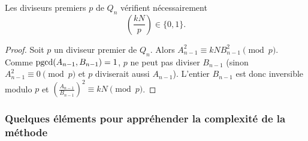 \begin{proposition}
	Les diviseurs premiers $p$ de $Q_n$ vérifient nécessairement
	\[\left(\frac{kN}{p} \right) \in \{0, 1\}.\]
\end{proposition}

\begin{proof}
	Soit $p$ un diviseur premier de $Q_n$. Alors $ A_{n-1}^2 \equiv kNB_{n-1}^2
	\pmod{p}$. Comme $\operatorname{pgcd}(A_{n-1},B_{n-1}) = 1$, $p$ ne peut pas diviser
	$B_{n-1}$ (sinon $A_{n-1}^2 \equiv 0 \pmod{p}$ et $p$ diviserait aussi
	$A_{n-1}$). L'entier $B_{n-1}$ est donc inversible modulo $p$ et $\left(
	\frac{A_{n-1}}{B_{n-1}}\right )^2 \equiv kN \pmod{p}$.
\end{proof}

\subsubsection{Quelques éléments pour appréhender la complexité de la méthode}
